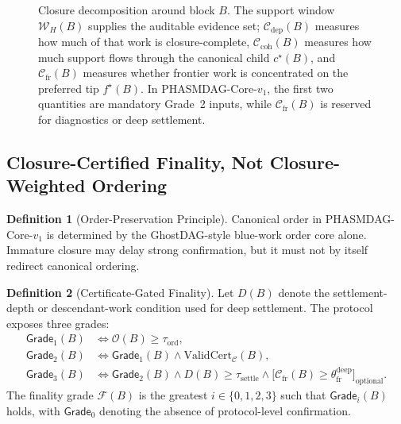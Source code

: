 \documentclass[11pt]{article}
\theoremstyle{definition}
\newtheorem{definition}{Definition}[section]
\theoremstyle{plain}
\theoremstyle{remark}
\newcommand{\Ostr}{\mathcal{O}}          %
\newcommand{\Cdep}{\mathcal{C}_{\mathrm{dep}}}
\newcommand{\Ccoh}{\mathcal{C}_{\mathrm{coh}}}
\newcommand{\Cfr}{\mathcal{C}_{\mathrm{fr}}}
\newcommand{\Ffin}{\mathcal{F}}          %
\begin{document}
\begin{figure}[t]
\caption{Closure decomposition around block $B$.  The support window
$\mathcal{W}_H(B)$ supplies the auditable evidence set; $\Cdep(B)$ measures how
much of that work is closure-complete, $\Ccoh(B)$ measures how much support
flows through the canonical child $c^\star(B)$, and $\Cfr(B)$ measures whether
frontier work is concentrated on the preferred tip $f^\star(B)$.
In PHASMDAG-Core-$v_1$, the first two quantities are mandatory Grade~2 inputs,
while $\Cfr(B)$ is reserved for diagnostics or deep settlement.}
\label{fig:closure_components}
\end{figure}

\subsection{Closure-Certified Finality, Not Closure-Weighted Ordering}

\begin{definition}[Order-Preservation Principle]\label{def:order_preserving}
Canonical order in PHASMDAG-Core-$v_1$ is determined by the GhostDAG-style
blue-work order core alone.
Immature closure may delay strong confirmation, but it must not by itself
redirect canonical ordering.
\end{definition}

\begin{definition}[Certificate-Gated Finality]\label{def:finality}
Let $D(B)$ denote the settlement-depth or descendant-work condition used for
deep settlement.
The protocol exposes three grades:
\begin{align}
\mathsf{Grade}_1(B)
&\iff
\Ostr(B) \ge \tau_{\mathrm{ord}},
\label{eq:grade1} \\
\mathsf{Grade}_2(B)
&\iff
\mathsf{Grade}_1(B) \wedge \mathrm{ValidCert}_{\mathcal{C}}(B),
\label{eq:grade2} \\
\mathsf{Grade}_3(B)
&\iff
\mathsf{Grade}_2(B) \wedge D(B) \ge \tau_{\mathrm{settle}}
\wedge \bigl[\Cfr(B) \ge \theta^{\mathrm{deep}}_{\mathrm{fr}}\bigr]_{\mathrm{optional}}.
\label{eq:grade3}
\end{align}
The finality grade $\Ffin(B)$ is the greatest $i \in \{0,1,2,3\}$ such that
$\mathsf{Grade}_i(B)$ holds, with $\mathsf{Grade}_0$ denoting the absence of
protocol-level confirmation.
\end{definition}
\end{document}
